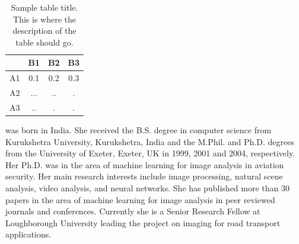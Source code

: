 \documentclass{classe_cn}                 %
\begin{document}
\begin{table}[h!]
\label{tag_tabela_01}
\caption{Sample table title. This is where the description of the table should go.}
  \begin{tabular}{cccc}
  \hline
       & B1   & B2   & B3   \\ \hline
   A1  & 0.1  & 0.2  & 0.3  \\
   A2  & ...  & ..   & .    \\
   A3  & ..   & .    & .    \\ \hline
  \end{tabular}
\end{table}


\vspace{1.0cm}
 was born in India. She received the B.S. 
degree in computer science from Kurukshetra University, Kurukshetra, 
India and the M.Phil. and Ph.D. degrees from the University of Exeter, 
Exeter, UK in 1999, 2001 and 2004, respectively. Her Ph.D. was in the 
area of machine learning for image analysis in aviation security. Her 
main research interests include image processing, natural scene analysis,
video analysis, and neural networks. She has published more than 30 papers
in the area of machine learning for image analysis in peer reviewed 
journals and conferences. Currently she is a Senior Research Fellow at
Loughborough University leading the project on imaging for road transport
applications.
\end{document}
